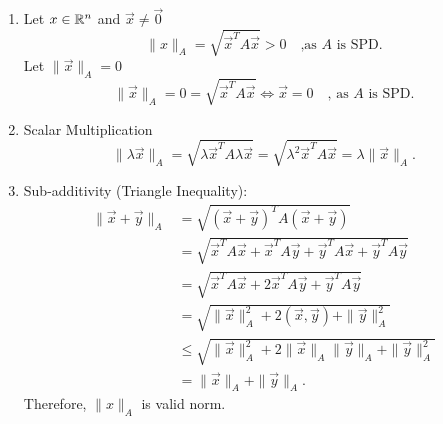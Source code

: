 \documentclass{report}
\begin{document}
\begin{solution}
\begin{enumerate}[label=(\alph*)]
\begin{enumerate}[label=(\roman*)]
		      \end{enumerate}

		      \begin{enumerate}[label=(\roman*)]
			      \item  	Let $x\in \RR^{n} $ and $\vec x \neq \vec 0$    \[
				            \|x\|_A = \sqrt{\vec x^{T}A\vec x}  >0  \quad \text{,as $A$ is SPD}
				            .\]
			            Let $\|\vec x \|_A =0$
			            \[
				            \|\vec x \|_A =0 = \sqrt{\vec x^{T} A \vec x}  \iff \vec x = 0 \quad \text{, as $A$ is SPD}
				            .\]

			      \item Scalar Multiplication\\
			            \[
				            \|\lambda \vec x \|_A = \sqrt{\lambda \vec x^{T} A \lambda \vec x} = \sqrt{\lambda^{2} \vec x^{T} A \vec x}    = \lambda \|\vec x\|_A
				            .\]
			      \item Sub-additivity (Triangle Inequality):\\
			            \begin{align*}
				            \|\vec x+ \vec y\|_A
				             & = \sqrt{\left( \vec x+ \vec y \right)^{T} A \left( \vec x+ \vec y \right)  } \\
				             & =  \sqrt{\vec x^{T}A\vec x + \vec x^{T}A\vec y + \vec y^{T}A\vec x +\vec y^{T}A\vec y  } \\
				             & = \sqrt{\vec x^{T}A\vec x + 2\vec x^{T}A\vec y +\vec y^{T}A\vec y  } \\
				             & =   \sqrt{\|\vec x\|_A^2+ 2 \left( \vec x,\vec y \right)  +\|\vec y\|_A^2 } \\
				             & \le  \sqrt{\|\vec x\|_A^{2}+ 2 \|\vec x\|_A\|\vec y\|_A   +\|\vec y\|_A^2 } \\
				             & =  \| \vec x\|_A  + \| \vec y \|_A
				            .\end{align*}
			            Therefore, $\|x\|_A$ is valid norm.
		      \end{enumerate}
	\end{enumerate}
\end{solution}
\end{document}
